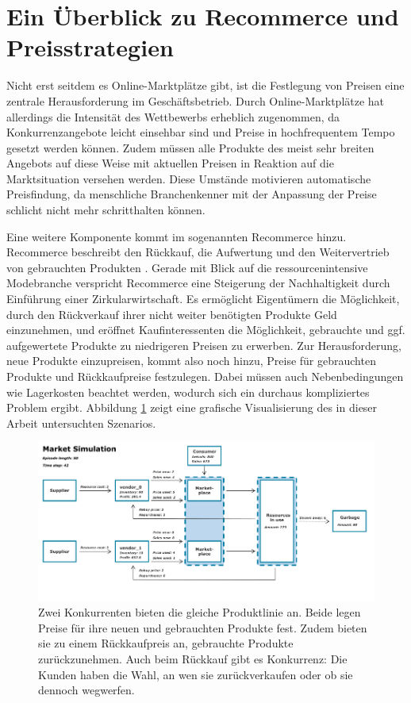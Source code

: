 \section{Ein Überblick zu Recommerce und Preisstrategien}
Nicht erst seitdem es Online-Marktplätze gibt, ist die Festlegung von Preisen eine zentrale Herausforderung im Geschäftsbetrieb.
Durch Online-Marktplätze hat allerdings die Intensität des Wettbewerbs erheblich zugenommen, da Konkurrenzangebote leicht einsehbar sind und Preise in hochfrequentem Tempo gesetzt werden können.
Zudem müssen alle Produkte des meist sehr breiten Angebots auf diese Weise mit aktuellen Preisen in Reaktion auf die Marktsituation versehen werden.
Diese Umstände motivieren automatische Preisfindung, da menschliche Branchenkenner mit der Anpassung der Preise schlicht nicht mehr schritthalten können.

Eine weitere Komponente kommt im sogenannten Recommerce hinzu.
Recommerce beschreibt den Rückkauf, die Aufwertung und den Weitervertrieb von gebrauchten Produkten \cite{deges2019grundlagen}.
Gerade mit Blick auf die ressourcenintensive Modebranche verspricht Recommerce eine Steigerung der Nachhaltigkeit durch Einführung einer Zirkularwirtschaft.
Es ermöglicht Eigentümern die Möglichkeit, durch den Rückverkauf ihrer nicht weiter benötigten Produkte Geld einzunehmen, und eröffnet Kaufinteressenten die Möglichkeit, gebrauchte und ggf. aufgewertete Produkte zu niedrigeren Preisen zu erwerben.
Zur Herausforderung, neue Produkte einzupreisen, kommt also noch hinzu, Preise für gebrauchten Produkte und Rückkaufpreise festzulegen.
Dabei müssen auch Nebenbedingungen wie Lagerkosten beachtet werden, wodurch sich ein durchaus kompliziertes Problem ergibt.
Abbildung \ref{grafic:MarketOverview} zeigt eine grafische Visualisierung des in dieser Arbeit untersuchten Szenarios.

\begin{figure}[htbp]
	\label{grafic:MarketOverview}
	\centering
	\includegraphics{introduction/MarketOverview_042.png}
	\caption{
		Zwei Konkurrenten bieten die gleiche Produktlinie an.
		Beide legen Preise für ihre neuen und gebrauchten Produkte fest.
		Zudem bieten sie zu einem Rückkaufpreis an, gebrauchte Produkte zurückzunehmen.
		Auch beim Rückkauf gibt es Konkurrenz: Die Kunden haben die Wahl, an wen sie zurückverkaufen oder ob sie dennoch wegwerfen.
	}
\end{figure}

